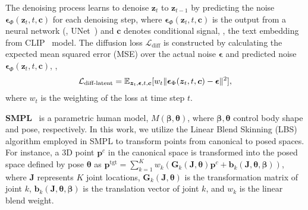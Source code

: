 The denoising process learns to denoise $\bm{z}_{t}$ to $\bm{z}_{t-1}$ by predicting the noise $\bm{\epsilon}_{\Phi}(\bm{z}_{t}, t, \bm{c})$ for each denoising step, where $\bm{\epsilon}_{\Phi}(\bm{z}_{t}, t, \bm{c})$ is the output from a neural network (\eg, UNet~\cite{ronneberger2015u}) and $\bm{c}$ denotes conditional signal, \eg, the text embedding from CLIP~\cite{radford2021learning} model.
The diffusion loss $\mathcal{L}_\text{diff}$ is constructed by calculating the expected mean squared error (MSE) over the actual noise $\bm{\epsilon}$ and predicted noise $\bm{\epsilon}_{\Phi}(\bm{z}_{t}, t, \bm{c})$, \ie, 
\begin{equation}
\label{eqn:denoising_process}
    \begin{aligned}
        \mathcal{L}_\text{diff-latent}=\mathbb{E}_{\bm{z}_{t}, \bm{\epsilon}, t, \bm{c}}[w_t\Arrowvert\bm{\epsilon}_{\Phi}(\bm{z}_{t}, t, \bm{c}) - \bm{\epsilon}\Arrowvert^{2}],
    \end{aligned}
\end{equation}
where $w_t$ is the weighting of the loss at time step $t$.


\noindent \textbf{SMPL}~\cite{SMPL:2015} is a parametric human model, $M(\bm{\beta}, \bm{\theta})$, where $\bm{\beta}, \bm{\theta}$ control body shape and pose, respectively. 
In this work, we utilize the Linear Blend Skinning (LBS) algorithm employed in SMPL to transform points from canonical to posed spaces.
For instance, a 3D point $\bm{p}^c$ in the canonical space is transformed into the posed space defined by pose $\bm{\theta}$ as $\bm{p}^\text{tgt} = \sum_{k=1}^{K}w_{k}(\bm{G}_k(\bm{J}, \bm{\theta})\bm{p}^c+\bm{b}_k(\bm{J}, \bm{\theta}, \bm{\beta}))$, where $\bm{J}$ represents $K$ joint locations, $\bm{G}_k(\bm{J}, \bm{\theta})$ is the transformation matrix of joint $k$, $\bm{b}_k(\bm{J}, \bm{\theta}, \bm{\beta})$ is the translation vector of joint $k$, and $w_{k}$ is the linear blend weight.

